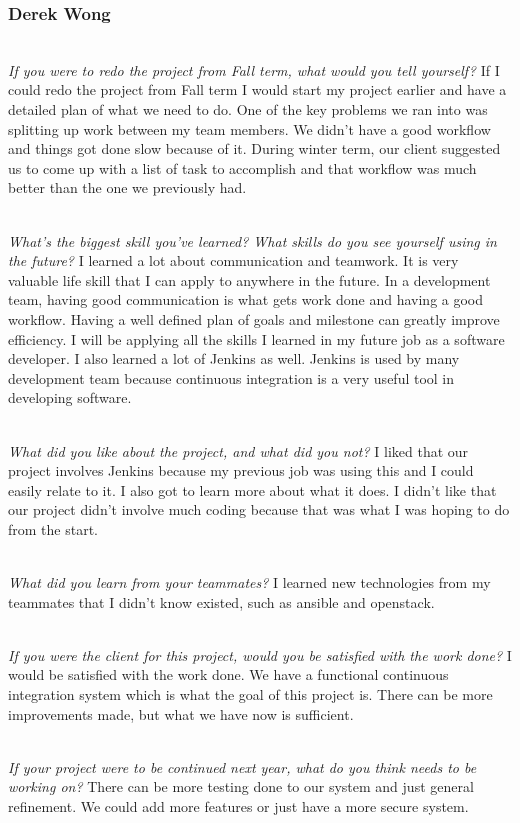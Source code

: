 \documentclass[10pt,letterpaper,onecolumn,draftclsnofoot]{IEEEtran}
\begin{document}
\subsubsection{Derek Wong}
\textit{\\If you were to redo the project from Fall term, what would you tell yourself?}
If I could redo the project from Fall term I would start my project earlier and have a detailed plan of what we need to do. One of the key problems we ran into was splitting up work between my team members. We didn't have a good workflow and things got done slow because of it. During winter term, our client suggested us to come up with a list of task to accomplish and that workflow was much better than the one we previously had.

\textit{\\What's the biggest skill you've learned? What skills do you see yourself using in the future?}
I learned a lot about communication and teamwork. It is very valuable life skill that I can apply to anywhere in the future. In a development team, having good communication is what gets work done and having a good workflow. Having a well defined plan of goals and milestone can greatly improve efficiency. I will be applying all the skills I learned in my future job as a software developer. I also learned a lot of Jenkins as well. Jenkins is used by many development team because continuous integration is a very useful tool in developing software.

\textit{\\What did you like about the project, and what did you not?}
I liked that our project involves Jenkins because my previous job was using this and I could easily relate to it. I also got to learn more about what it does. I didn't like that our project didn't involve much coding because that was what I was hoping to do from the start.

\textit{\\What did you learn from your teammates?}
I learned new technologies from my teammates that I didn't know existed, such as ansible and openstack.

\textit{\\If you were the client for this project, would you be satisfied with the work done?}
I would be satisfied with the work done. We have a functional continuous integration system which is what the goal of this project is. There can be more improvements made, but what we have now is sufficient.

\textit{\\If your project were to be continued next year, what do you think needs to be working on?}
There can be more testing done to our system and just general refinement. We could add more features or just have a more secure system.\\


\clearpage


\end{document}
